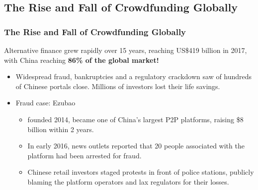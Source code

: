 \documentclass[aspectratio=169,xcolor=dvipsnames]{beamer}
\begin{document}

\subsection{The Rise and Fall of Crowdfunding Globally}






\begin{frame}
\frametitle{The Rise and Fall of Crowdfunding Globally}


Alternative finance grew rapidly over 15 years, reaching US\$419 billion in 2017, with China reaching \textbf{86\% of the global market!} 

\medskip

\begin{itemize}
    \item Widespread fraud, bankruptcies and a regulatory crackdown saw of hundreds of Chinese portals close. Millions of investors lost their life savings.
    \medskip 
    
    \item Fraud case: Ezubao
    \begin{itemize}
        \item founded 2014, became one of China’s largest P2P platforms, raising \$8 billion within 2 years.
        \smallskip 
        \item In early 2016, news outlets reported that 20 people associated with the platform had been arrested for fraud. 
        \smallskip 
        \item Chinese retail investors staged protests in front of police stations, publicly blaming the platform operators and lax regulators for their losses.
    \end{itemize}
\end{itemize}

\end{frame} 




\end{document}
